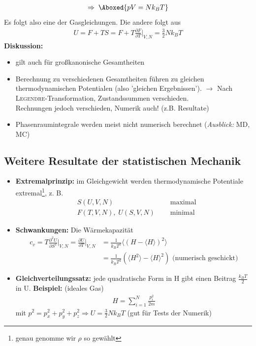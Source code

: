 \documentclass[12pt]{article}
\begin{document}
\begin{align}
 \Rightarrow \; \Aboxed{ p V = N k_B T}
\end{align}
Es folgt also eine der Gasgleichungen. Die andere folgt aus
\begin{align}
U = F + TS = F + T \frac{\partial F}{\partial T} \biggr\vert_{V,N} = \frac{3}{2} N k_B T
\end{align}
\textbf{Diskussion:} \\
\begin{itemize}
\item gilt auch für großkanonische Gesamtheiten
\item Berechnung zu verschiedenen Gesamtheiten führen zu gleichen thermodynamischen Potentialen (also 'gleichen Ergebnissen'). $\to$ Nach \textsc{Legendre}-Transformation, Zustandssummen verschieden. \\
Rechnungen jedoch verschieden, Numerik auch! (z.B. Resultate) %
\item Phasenraumintegrale werden meist nicht numerisch berechnet %
(\textit{Ausblick:} MD, MC) 
\end{itemize}
\subsection{Weitere Resultate der statistischen Mechanik}
\begin{itemize}
\item \textbf{Extremalprinzip:} im Gleichgewicht werden thermodynamische Potentiale extremal\footnote{genau genomme wir $\rho$ so gewählt}, z. B. 
\begin{align}
& S(U,V,N) \, && \mbox{ maximal} \\
& F(T,V,N), \; U(S,V,N) \; && \mbox{ minimal}
\end{align}
\item \textbf{Schwankungen:} Die Wärmekapazität
\begin{align}
c_v = T \frac{\partial ^2 U}{\partial S ^2} \biggr\vert_{V,N} = \frac{\partial U}{\partial T}  \biggr\vert_{V,N} &= \frac{1}{k_B T^2} \langle (H - \langle H \rangle)^2\rangle \\
&= \frac{1}{k_B T^2} \left( \langle H^2 \rangle - \langle H \rangle ^2 \right) \mbox{ (numerisch geschickt)}
\end{align}
\item \textbf{Gleichverteilungssatz:} jede quadratische Form in H gibt einen Beitrag $\frac{k_B T}{2}$ in U. 
\textbf{Beispiel:} (ideales Gas) 
\begin{align*}
H = \sum_{i=1}^N \frac{p_i ^2}{2m}
\end{align*}
mit $p^2 = p_x^2 + p_y^2 + p_z^2 \Rightarrow U= \frac{3}{2} N k_B T$ (gut für Tests der Numerik) 
\end{itemize}
\end{document}
